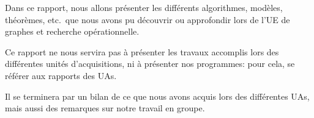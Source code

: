 
Dans ce rapport, nous allons présenter les différents algorithmes, modèles,
théorèmes, etc.\  que nous avons pu découvrir ou approfondir lors de l'UE de
graphes et recherche opérationnelle.

Ce rapport ne nous servira pas à présenter les travaux accomplis lors
des différentes unités d'acquisitions, ni à présenter nos programmes: pour
cela, se référer aux rapports des UAs.

Il se terminera par un bilan de ce que nous avons acquis lors des différentes
UAs, mais aussi des remarques sur notre travail en groupe.
